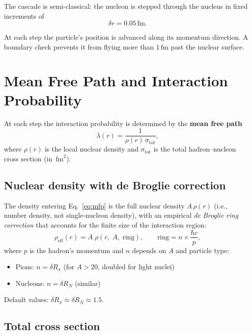 \documentclass[11pt,a4paper]{article}
\newcommand{\unit}[1]{\,\mathrm{#1}}
\newcommand{\fm}{\unit{fm}}
\begin{document}
The cascade is semi-classical: the nucleon is stepped through the
nucleus in fixed increments of
\begin{equation}
  \delta r = 0.05\fm.
\end{equation}

At each step the particle's position is advanced along its momentum
direction.  A boundary check prevents it from flying more than $1\fm$
past the nuclear surface.

\section{Mean Free Path and Interaction Probability}

At each step the interaction probability is determined by the
\textbf{mean free path}
\begin{equation}\label{eq:mfp}
  \lambda(r) = \frac{1}{\rho(r)\,\sigma_{\text{tot}}},
\end{equation}
where $\rho(r)$ is the local nuclear density and $\sigma_{\text{tot}}$ is
the total hadron--nucleon cross section (in $\fm^{2}$).

\subsection{Nuclear density with de Broglie correction}

The density entering Eq.~\eqref{eq:mfp} is the full nuclear density
$A\,\rho(r)$ (i.e., number density, not single-nucleon density), with an
empirical \emph{de Broglie ring correction} that accounts for the finite
size of the interaction region:
\begin{equation}
  \rho_{\text{eff}}(r) = A\;\rho\!\left(r,\;A,\;\text{ring}\right),
  \qquad
  \text{ring} = n \times \frac{\hbar c}{p},
\end{equation}
where $p$ is the hadron's momentum and $n$ depends on $A$ and particle
type:
\begin{itemize}[nosep]
  \item Pions: $n = \delta R_{\pi}$ (for $A > 20$, doubled for light nuclei)
  \item Nucleons: $n = \delta R_{N}$ (similar)
\end{itemize}
Default values: $\delta R_{\pi} \approx \delta R_{N} \approx 1.5$.

\subsection{Total cross section}
\end{document}
